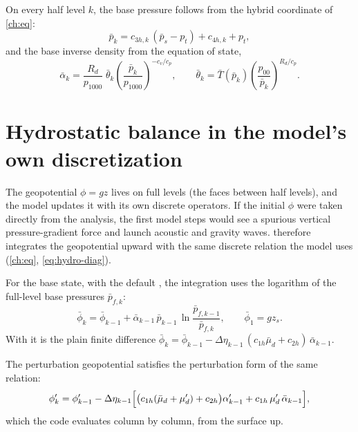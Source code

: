 On every half level $k$, the base pressure follows from the hybrid coordinate of \cref{ch:eq}:
\begin{equation}
  \bar p_k = c_{3h,k}\,(\bar p_s - p_t) + c_{4h,k} + p_t ,
\end{equation}
and the base inverse density from the equation of state,
\begin{equation}
  \bar\alpha_k = \frac{R_d}{p_{1000}}\;\bar\theta_k \left(\frac{\bar p_k}{p_{1000}}\right)^{-c_v/c_p},
  \qquad \bar\theta_k = \bar T(\bar p_k)\left(\frac{p_{00}}{\bar p_k}\right)^{R_d/c_p}.
\end{equation}

\section{Hydrostatic balance in the model's own discretization}

The geopotential $\phi = gz$ lives on full levels (the faces between half levels), and the model updates it with its
own discrete operators. If the initial $\phi$ were taken directly from the analysis, the first model steps would see
a spurious vertical pressure-gradient force and launch acoustic and gravity waves.  therefore
integrates the geopotential upward with the same discrete relation the model uses (\cref{ch:eq},
\cref{eq:hydro-diag}).

For the base state, with the default , the integration uses the logarithm of the full-level
base pressures $\bar p_{f,k}$:
\begin{equation}
  \bar\phi_{k} = \bar\phi_{k-1} + \bar\alpha_{k-1}\,\bar p_{k-1}\,\ln\frac{\bar p_{f,k-1}}{\bar p_{f,k}},
  \qquad \bar\phi_1 = g z_s .
  \label{eq:phb-hyps2}
\end{equation}
With  it is the plain finite difference
$\bar\phi_{k} = \bar\phi_{k-1} - \Delta\eta_{k-1}\,(c_{1h}\bar\mu_d + c_{2h})\,\bar\alpha_{k-1}$.

The perturbation geopotential satisfies the perturbation form of the same relation:
\begin{equation}
  \phi'_{k} = \phi'_{k-1} - \Delta\eta_{k-1}\Bigl[\bigl(c_{1h}(\bar\mu_d+\mu'_d)+c_{2h}\bigr)\alpha'_{k-1}
             + c_{1h}\,\mu'_d\,\bar\alpha_{k-1}\Bigr],
  \label{eq:php-pert}
\end{equation}
which the code evaluates column by column, from the surface up.

